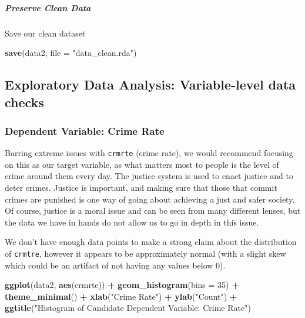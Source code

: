 \documentclass[]{article}
\newenvironment{Shaded}{\begin{snugshade}}{\end{snugshade}}
\newcommand{\DataTypeTok}[1]{\textcolor[rgb]{0.13,0.29,0.53}{#1}}
\newcommand{\DecValTok}[1]{\textcolor[rgb]{0.00,0.00,0.81}{#1}}
\newcommand{\KeywordTok}[1]{\textcolor[rgb]{0.13,0.29,0.53}{\textbf{#1}}}
\newcommand{\NormalTok}[1]{#1}
\newcommand{\OperatorTok}[1]{\textcolor[rgb]{0.81,0.36,0.00}{\textbf{#1}}}
\newcommand{\StringTok}[1]{\textcolor[rgb]{0.31,0.60,0.02}{#1}}
\let\oldsubparagraph\subparagraph
\renewcommand{\subparagraph}[1]{\oldsubparagraph{#1}\mbox{}}
\begin{document}
\hypertarget{preserve-clean-data}{%
\subparagraph{Preserve Clean Data}\label{preserve-clean-data}}

Save our clean dataset

\begin{Shaded}
\begin{Highlighting}[]
\KeywordTok{save}\NormalTok{(data2, }\DataTypeTok{file =} \StringTok{"data_clean.rda"}\NormalTok{)}
\end{Highlighting}
\end{Shaded}

\hypertarget{exploratory-data-analysis-variable-level-data-checks}{%
\subsection{Exploratory Data Analysis: Variable-level data
checks}\label{exploratory-data-analysis-variable-level-data-checks}}

\hypertarget{dependent-variable-crime-rate}{%
\subsubsection{Dependent Variable: Crime
Rate}\label{dependent-variable-crime-rate}}

Barring extreme issues with \texttt{crmrte} (crime rate), we would
recommend focusing on this as our target variable, as what matters most
to people is the level of crime around them every day. The justice
system is used to enact justice and to deter crimes. Justice is
important, and making sure that those that commit crimes are punished is
one way of going about achieving a just and safer society. Of course,
justice is a moral issue and can be seen from many different lenses, but
the data we have in hands do not allow us to go in depth in this issue.

We don't have enough data points to make a strong claim about the
distribution of \texttt{crmtre}, however it appears to be approximately
normal (with a slight skew which could be an artifact of not having any
values below 0).

\begin{Shaded}
\begin{Highlighting}[]
\KeywordTok{ggplot}\NormalTok{(data2, }\KeywordTok{aes}\NormalTok{(crmrte)) }\OperatorTok{+}
\StringTok{  }\KeywordTok{geom_histogram}\NormalTok{(}\DataTypeTok{bins =} \DecValTok{35}\NormalTok{) }\OperatorTok{+}
\StringTok{  }\KeywordTok{theme_minimal}\NormalTok{() }\OperatorTok{+}
\StringTok{  }\KeywordTok{xlab}\NormalTok{(}\StringTok{"Crime Rate"}\NormalTok{) }\OperatorTok{+}
\StringTok{  }\KeywordTok{ylab}\NormalTok{(}\StringTok{"Count"}\NormalTok{) }\OperatorTok{+}
\StringTok{  }\KeywordTok{ggtitle}\NormalTok{(}\StringTok{"Histogram of Candidate Dependent Variable: Crime Rate"}\NormalTok{)}
\end{Highlighting}
\end{Shaded}
\end{document}

